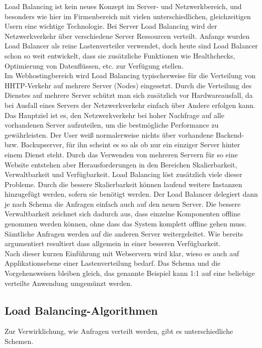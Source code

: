 \documentclass[letterpaper, 12pt]{article}
\let\tempsubsection\subsection
\renewcommand\subsection[1]{\vspace{0cm}\tempsubsection{#1}\vspace{0cm}}
\begin{document}
Load Balancing ist kein neues Konzept im Server- und Netzwerkbereich, und besonders wie hier im Firmenbereich mit vielen unterschiedlichen, gleichzeitigen Usern eine wichtige Technologie. Bei
Server Load Balancing wird der Netzwerkverkehr über verschiedene Server Ressourcen verteilt. Anfangs
wurden Load Balancer als reine Lastenverteiler verwendet, doch heute sind Load Balancer schon so
weit entwickelt, dass sie zusätzliche Funktionen wie Healthchecks, Optimierung von Datenflüssen,
etc. zur Verfügung stellen. \\
Im Webhostingbereich wird Load Balancing typischerweise für die Verteilung von HHTP-Verkehr auf
mehrere Server (Nodes) eingesetzt. Durch die Verteilung des Dienstes auf mehrere Server schützt man
sich zusätzlich vor Hardwareausfall, da bei Ausfall eines Servers der Netzwerkverkehr einfach
über Andere erfolgen kann. Das Hauptziel ist es, den Netzwerkverkehr bei hoher Nachfrage
auf alle vorhandenen Server aufzuteilen, um die bestmögliche Performance zu gewährleisten. Der
User weiß normalerweise nichts über vorhandene Backend- bzw. Backupserver, für ihn scheint es
so als ob nur ein einziger Server hinter einem Dienst steht. Durch das Verwenden von
mehreren Servern für so eine Website entstehen aber Herausforderungen in den Bereichen Skalierbarkeit,
Verwaltbarkeit und Verfügbarkeit. Load Balancing löst zusätzlich viele dieser Probleme. Durch die bessere Skalierbarkeit können laufend weitere Instanzen hinzugefügt werden, sofern sie benötigt werden. Der Load Balancer delegiert dann je nach Schema die Anfragen einfach auch auf den neuen Server. Die bessere Verwaltbarkeit zeichnet sich dadurch aus, dass einzelne Komponenten offline genommen werden können, ohne dass das System komplett offline gehen muss. Sämtliche Anfragen werden auf die anderen Server weitergeleitet. Wie bereits argumentiert resultiert dass allgemein in einer besseren Verfügbarkeit. \\
Nach dieser kurzen Einführung mit Webservern wird klar, wieso es auch auf Applikationsebene einer Lastenverteilung bedarf. Das Schema und die Vorgehensweisen bleiben gleich, das genannte Beispiel kann 1:1 auf eine beliebige verteilte Anwendung umgemünzt werden. \cite{ausarbeitunglb}

\subsection{Load Balancing-Algorithmen}

Zur Verwirklichung, wie Anfragen verteilt werden, gibt es unterschiedliche Schemen.
\end{document}
